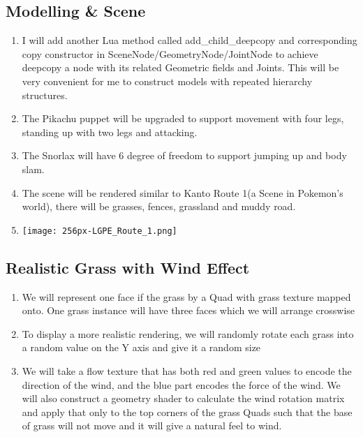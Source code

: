 \documentclass {article}
\begin{document}
     \subsection{Modelling \& Scene}
     \begin{enumerate}
        \item I will add another Lua method called add\_child\_deepcopy and corresponding copy constructor in SceneNode/GeometryNode/JointNode to achieve deepcopy a node with its related Geometric fields and Joints.
        This will be very convenient for me to construct models with repeated hierarchy structures.
        \item The Pikachu puppet will be upgraded to support movement with four legs, standing up with two legs and attacking. 
        \item The Snorlax will have 6 degree of freedom to support jumping up and body slam.
        \item The scene will be rendered similar to Kanto Route 1(a Scene in Pokemon's world), there will be grasses, fences, grassland and muddy road.
        \item \texttt{[image: 256px-LGPE\_Route\_1.png]}
     \end{enumerate}

     \subsection{Realistic Grass with Wind Effect}
     \begin{enumerate}
        \item We will represent one face if the grass by a Quad with grass texture mapped onto. One grass instance will have three faces which we will arrange crosswise
        \item To display a more realistic rendering, we will randomly rotate each grass into a random value on the Y axis and give it a random size
        \item We will take a flow texture that has both red and green values to encode the direction of the wind, and the blue part encodes the force of the wind.
        We will also construct a geometry shader to calculate the wind rotation matrix and apply that only to the top corners of the grass Quads such that the base of grass will not move and it will give a natural feel to wind.
     \end{enumerate}
\end{document}
